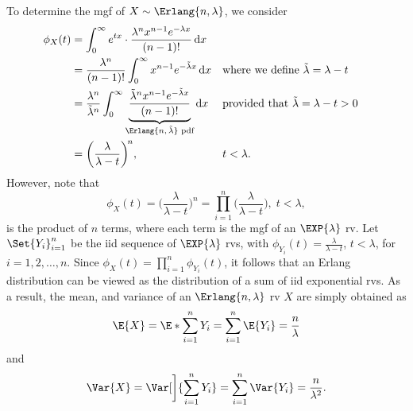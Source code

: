\begin{Regular}
    To determine the mgf of $ X \sim \Erlang{n,\lambda} $, we consider
    \begin{align*}
        \phi_X(t)
         & =\int_{0}^{\infty}e^{tx}\cdot \frac{\lambda^n x^{n-1}e^{-\lambda x}}{(n-1)!}\odif{x}                                                                                                               \\
         & =\frac{\lambda^n}{(n-1)!}\int_{0}^{\infty}x^{n-1}e^{-\tilde{\lambda}x}\odif{x}       &                                                      & \text{where we define $ \tilde{\lambda}=\lambda-t $} \\
         & =\frac{\lambda^n}{\tilde{\lambda}^n}
        \int_{0}^{\infty}
        \underbrace{\frac{\tilde{\lambda}^n x^{n-1}e^{-\tilde{\lambda}x}}{(n-1)!}}_{\text{$\Erlang{n,\tilde{\lambda}}$ pdf}}\odif{x}
         &                                                                                      & \text{provided that $ \tilde{\lambda}=\lambda-t>0 $}                                                        \\
         & =\biggl(\frac{\lambda}{\lambda-t}\biggr)^{\!n},                                      &                                                      & t<\lambda.
    \end{align*}
    However, note that
    \[ \phi_X(t)=\biggl(\frac{\lambda}{\lambda-t}\biggr)^{\!n}=\prod_{i=1}^n\biggl(\frac{\lambda}{\lambda-t}\biggr),\;t<\lambda, \]
    is the product of $ n $ terms, where each term is the mgf of an $ \EXP{\lambda} $ rv.
    Let $ \Set{Y_i}_{i=1}^n $ be the iid sequence of $ \EXP{\lambda} $ rvs, with $ \phi_{Y_i}(t)=\frac{\lambda}{\lambda-t} $, $ t<\lambda $,
    for $ i=1,2,\ldots,n $. Since $ \phi_X(t)=\prod_{i=1}^n \phi_{Y_i}(t) $, it follows that an Erlang distribution can be viewed as the
    distribution of a sum of iid exponential rvs. As a result, the mean, and variance of an $ \Erlang{n,\lambda} $ rv $ X $
    are simply obtained as
    \[ \E{X}=\E*{\sum_{i=1}^{n}Y_i}=\sum_{i=1}^{n}\E{Y_i}=\frac{n}{\lambda} \]
    and
    \[ \Var{X}=\Var[\bigg]{\sum_{i=1}^{n}Y_i}=\sum_{i=1}^{n}\Var{Y_i}=\frac{n}{\lambda^2}. \]
\end{Regular}